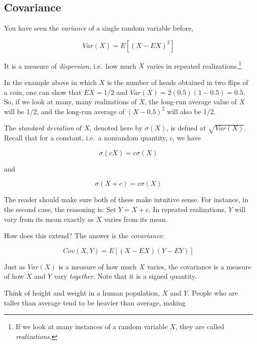 \subsection{Covariance}

You have seen the \textit{variance} of a single random variable before,

\begin{equation}
Var(X) = E[(X - EX)^2]
\end{equation}

It is a measure of \textit{dispersion}, i.e.\ how much $X$
varies in repeated realizations.\footnote{If we look at many instances
of a random variable $X$, they are called \textit{realizations}.}

In the example above in which $X$ is the number of heads obtained in two
flips of a coin, one can show that $EX = 1/2$ and
$Var(X) = 2(0.5)(1-0.5) = 0.5$.  So, if we look at many, many
realizations of $X$, the long-run average value of $X$ will be 1/2,
and the long-run average of $(X - 0.5)^2$ will also be 1/2.

The \textit{standard deviation} of $X$, denoted here by $\sigma(X)$,
is defned at $\sqrt{Var(X)}$.  Recall that for a constant, i.e.\ a
nonrandom quantity, $c$, we have

\begin{equation}
\sigma(cX) = c \sigma(X)
\end{equation}

and 

\begin{equation}
\sigma(X+c) = c \sigma(X)
\end{equation}

The reader should make sure both of these make intuitive sense.  For
instance, in the second case, the reasoning is:  Set $Y = X + c$.  In
repeated realizations, $Y$ will vary from its mean exactly as $X$
varies from its mean.

How does this extend?  The answer is the \textit{covariance}:

\begin{equation}
Cov(X,Y) = E[(X - EX) (Y - EY)]
\end{equation}

Just as $Var(X)$ is a measure of how much $X$ varies, the covariance is
a measure of how $X$ and $Y$ vary \textit{together}.  Note that it is a
signed quantity.

Think of height and weight in a human population, $X$ and $Y$. People
who are taller than average tend to be heavier than average, making

